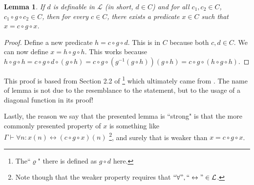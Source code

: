 \documentclass{article}
\newtheorem{lemma}[theorem]{Lemma}
\begin{document}
\begin{lemma}
If $d$ is definable in $\mathcal{L}$ (in short, $d \in C$) and for all $c_1, c_2 \in C$, $c_1 \circ g \circ c_2 \in C$, then for every $c \in C$, there exists a predicate $x \in C$ such that $x = c \circ g \circ x$.
\end{lemma}
\begin{proof}
Define a new predicate $h = c \circ g \circ d$. This is in $C$ because both $c, d \in C$. We can now define $x = h \circ g \circ h$. This works because $h \circ g \circ h = c \circ g \circ d \circ (g \circ h) = c \circ g \circ (g^{-1}(g \circ h))(g \circ h) = c \circ g \circ (h \circ g \circ h)$.
\end{proof}

This proof is based from Section 2.2 of \cite{salehi}\footnote{The``$\varrho$" there is defined as $g \circ d$ here.} which ultimately came from \cite{jeroslow}. The name of lemma is not due to the resemblance to the statement, but to the usage of a diagonal function in its proof!

Lastly, the reason we say that the presented lemma is ``strong" is that the more commonly presented property of $x$ is something like $\Gamma \vdash \forall n: x(n) \leftrightarrow (c \circ g \circ x)(n)$ \footnote{Note though that the weaker property requires that $``\forall", ``\leftrightarrow" \in \mathcal{L}$.}, and surely that is weaker than $x = c \circ g \circ x$.



\end{document}
